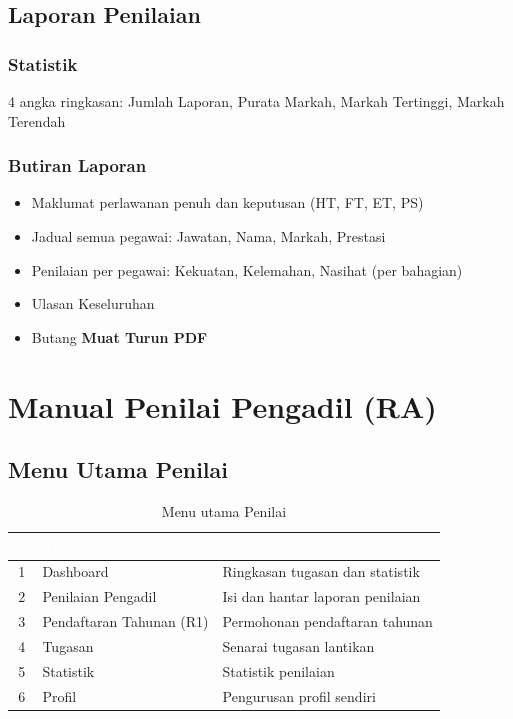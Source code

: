 \documentclass[12pt,a4paper]{report}
\newcommand{\btn}[1]{\colorbox{primaryblue!10}{\textcolor{primaryblue}{\textbf{#1}}}}
\begin{document}
\section{Laporan Penilaian}

\subsection{Statistik}
4 angka ringkasan: Jumlah Laporan, Purata Markah, Markah Tertinggi, Markah Terendah

\subsection{Butiran Laporan}
\begin{itemize}[label=\textcolor{pbnpblue}{\faChevronRight}]
  \item Maklumat perlawanan penuh dan keputusan (HT, FT, ET, PS)
  \item Jadual semua pegawai: Jawatan, Nama, Markah, Prestasi
  \item Penilaian per pegawai: Kekuatan, Kelemahan, Nasihat (per bahagian)
  \item Ulasan Keseluruhan
  \item Butang \btn{Muat Turun PDF}
\end{itemize}

\chapter{Manual Penilai Pengadil (RA)}

\section{Menu Utama Penilai}

\begin{table}[H]
\centering
{}
\begin{tabularx}{\textwidth}{c l X}
\toprule
\rowcolor{tableheader}
\textcolor{white}{\textbf{\#}} & \textcolor{white}{\textbf{Menu}} & \textcolor{white}{\textbf{Fungsi}} \\
\midrule
1 & Dashboard & Ringkasan tugasan dan statistik \\
2 & Penilaian Pengadil & Isi dan hantar laporan penilaian \\
3 & Pendaftaran Tahunan (R1) & Permohonan pendaftaran tahunan \\
4 & Tugasan & Senarai tugasan lantikan \\
5 & Statistik & Statistik penilaian \\
6 & Profil & Pengurusan profil sendiri \\
\bottomrule
\end{tabularx}
\caption{Menu utama Penilai}
\end{table}
\end{document}
